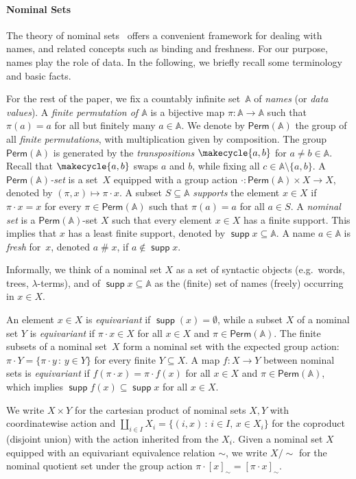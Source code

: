 \documentclass[10pt,a4paper]{amsart}
\theoremstyle{definition}
\newcommand{\seq}{\subseteq}
\newcommand{\At}{\mathds{A}}
\DeclareMathOperator{\supp}{\mathsf{supp}}
\newcommand{\Perm}{\mathsf{Perm}}
\newcommand{\names}{\At}
\newcommand{\fresh}{\mathbin{\#}}
\newcommand{\set}[1]{\{#1\}}
\newcommand{\setw}[2]{\{#1\,:\,#2\}}
\newcommand{\quotient}[2]{#1/{#2}} %
\begin{document}
\paragraph*{Nominal Sets}
The theory of nominal sets~\cite{Pitts2013} offers a convenient framework for dealing with names, and related concepts such as binding and freshness. For our purpose, names play the role of data.
In the following, we briefly recall some terminology and basic facts.

For the rest of the paper, we fix a countably infinite set~$\names$ of \emph{names} (or \emph{data values}). A \emph{finite permutation of $\names$} is a bijective map $\pi\colon \names\to\names$ such that $\pi(a) = a$ for all but finitely many $a\in \names$.
We denote by $\Perm(\names)$ the group of all \emph{finite permutations}, with multiplication given by composition.
The group $\Perm(\names)$ is generated by the \emph{transpositions} $\makecycle{a, b}$ for $a \neq b \in \names$.
Recall that $\makecycle{a, b}$ swaps $a$ and $b$, while fixing all $c\in \names\setminus \set{a, b}$.
A \emph{$\Perm(\names)$-set} is a set~$X$ equipped with a group action $\cdot\colon \Perm(\names) \times X \to X$,
denoted by $(\pi,x)\mapsto \pi\cdot x$. A subset $S\seq \names$ \emph{supports} the element $x\in X$ if $\pi \cdot x = x$ for every
$\pi\in\Perm(\names)$ such that $\pi(a) = a$ for all $a \in S$. A \emph{nominal set} is a $\Perm(\names)$-set $X$ such that every element $x\in X$ has a finite support.
This implies that $x$ has a least finite support, denoted by $\supp x \seq \names$. A name $a \in \names$ is \emph{fresh} for~$x$, denoted $a \fresh x$, if $a \notin \supp x$. 

Informally, we think of a nominal set $X$ as a set of syntactic objects (e.g.~words, trees,
$\lambda$-terms), and of $\supp x\seq \At$ as the (finite) set of names (freely) occurring in $x\in X$.


An element $x \in X$ is \emph{equivariant} if $\supp(x) = \emptyset$, while a subset $X$ of a nominal set $Y$ is \emph{equivariant} if $\pi\cdot x\in X$ for all $x\in X$ and $\pi\in\Perm(\names)$.
The finite subsets of a nominal set~$X$ form a nominal set with the expected group action: $\pi \cdot Y = \setw{\pi \cdot y}{y \in Y}$ for every finite $Y \subseteq X$.
A map $f\colon X \to Y$ between nominal sets is \emph{equivariant} if $f(\pi \cdot x) = \pi \cdot f(x)$ for all $x \in X$
and $\pi \in \Perm(\names)$, which implies $\supp f(x) \subseteq \supp
x$ for all $x \in X$.

We write $X\times Y$ for the cartesian product of nominal sets $X,Y$ with coordinatewise action and $\coprod_{i\in I} X_i = \setw{(i,x)}{i\in I,\, x\in X_i}$ for the coproduct (disjoint union) with the action inherited from the $X_i$.
Given a nominal set $X$ equipped with an equivariant equivalence relation $\sim$, we write $\quotient{X}{\sim}$ for the nominal quotient set under the group action $\pi \cdot [x]_\sim = [\pi\cdot x]_\sim$.
\end{document}

